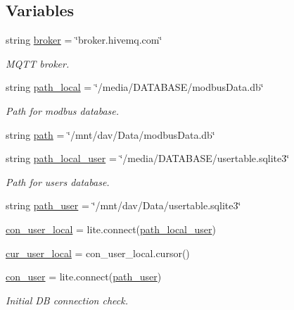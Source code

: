 \subsection*{Variables}
\begin{DoxyCompactItemize}
\item 
string \hyperlink{namespacemain3_afdf3bec321b3b9107003c09223640e80}{broker} = \char`\"{}broker.\+hivemq.\+com\char`\"{}
\begin{DoxyCompactList}\small\item\em M\+Q\+TT broker. \end{DoxyCompactList}\item 
string \hyperlink{namespacemain3_a8e2441fb4fc06f2788b1864358403339}{path\+\_\+local} = \char`\"{}/media/D\+A\+T\+A\+B\+A\+SE/modbus\+Data.\+db\char`\"{}
\begin{DoxyCompactList}\small\item\em Path for modbus database. \end{DoxyCompactList}\item 
string \hyperlink{namespacemain3_a94593883ff80bece1776244df08104a1}{path} = \char`\"{}/mnt/dav/Data/modbus\+Data.\+db\char`\"{}
\item 
string \hyperlink{namespacemain3_ab90723267d7b609bc02469c11db32a64}{path\+\_\+local\+\_\+user} = \char`\"{}/media/D\+A\+T\+A\+B\+A\+SE/usertable.\+sqlite3\char`\"{}
\begin{DoxyCompactList}\small\item\em Path for users database. \end{DoxyCompactList}\item 
string \hyperlink{namespacemain3_a7e2fe5acbb746b4190127a6d04b418ed}{path\+\_\+user} = \char`\"{}/mnt/dav/Data/usertable.\+sqlite3\char`\"{}
\item 
\hyperlink{namespacemain3_a693b4f7c34d4957bdd692bbb2ec9775f}{con\+\_\+user\+\_\+local} = lite.\+connect(\hyperlink{namespacemain3_ab90723267d7b609bc02469c11db32a64}{path\+\_\+local\+\_\+user})
\item 
\hyperlink{namespacemain3_a2fa22d0a5dd912937396dd96363ff968}{cur\+\_\+user\+\_\+local} = con\+\_\+user\+\_\+local.\+cursor()
\item 
\hyperlink{namespacemain3_a53e03f12882bc3b99c9324b7814074ec}{con\+\_\+user} = lite.\+connect(\hyperlink{namespacemain3_a7e2fe5acbb746b4190127a6d04b418ed}{path\+\_\+user})
\begin{DoxyCompactList}\small\item\em Initial DB connection check. \end{DoxyCompactList}\item 

\end{DoxyCompactItemize}
